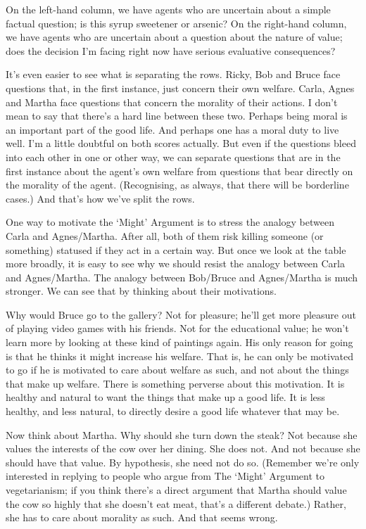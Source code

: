 \documentclass[
  10pt,
  letterpaper,
  DIV=11,
  numbers=noendperiod,
  twoside]{scrartcl}
\begin{document}
On the left-hand column, we have agents who are uncertain about a simple
factual question; is this syrup sweetener or arsenic? On the right-hand
column, we have agents who are uncertain about a question about the
nature of value; does the decision I'm facing right now have serious
evaluative consequences?

It's even easier to see what is separating the rows. Ricky, Bob and
Bruce face questions that, in the first instance, just concern their own
welfare. Carla, Agnes and Martha face questions that concern the
morality of their actions. I don't mean to say that there's a hard line
between these two. Perhaps being moral is an important part of the good
life. And perhaps one has a moral duty to live well. I'm a little
doubtful on both scores actually. But even if the questions bleed into
each other in one or other way, we can separate questions that are in
the first instance about the agent's own welfare from questions that
bear directly on the morality of the agent. (Recognising, as always,
that there will be borderline cases.) And that's how we've split the
rows.

One way to motivate the `Might' Argument is to stress the analogy
between Carla and Agnes/Martha. After all, both of them risk killing
someone (or something) statused if they act in a certain way. But once
we look at the table more broadly, it is easy to see why we should
resist the analogy between Carla and Agnes/Martha. The analogy between
Bob/Bruce and Agnes/Martha is much stronger. We can see that by thinking
about their motivations.

Why would Bruce go to the gallery? Not for pleasure; he'll get more
pleasure out of playing video games with his friends. Not for the
educational value; he won't learn more by looking at these kind of
paintings again. His only reason for going is that he thinks it might
increase his welfare. That is, he can only be motivated to go if he is
motivated to care about welfare as such, and not about the things that
make up welfare. There is something perverse about this motivation. It
is healthy and natural to want the things that make up a good life. It
is less healthy, and less natural, to directly desire a good life
whatever that may be.

Now think about Martha. Why should she turn down the steak? Not because
she values the interests of the cow over her dining. She does not. And
not because she should have that value. By hypothesis, she need not do
so. (Remember we're only interested in replying to people who argue from
The `Might' Argument to vegetarianism; if you think there's a direct
argument that Martha should value the cow so highly that she doesn't eat
meat, that's a different debate.) Rather, she has to care about morality
as such. And that seems wrong.
\end{document}
